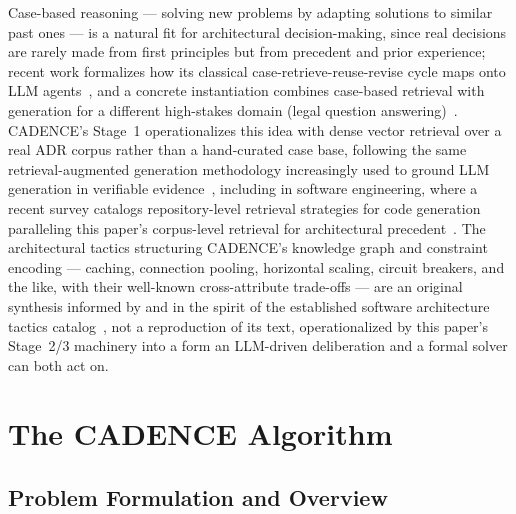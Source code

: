 \documentclass[preprint,12pt,authoryear]{elsarticle}
\renewcommand{\_}{\textunderscore\allowbreak{}}
\begin{document}
Case-based reasoning --- solving new problems by adapting solutions to similar past ones --- is a natural fit for architectural decision-making, since real decisions are rarely made from first principles but from precedent and prior experience; recent work formalizes how its classical case-retrieve-reuse-revise cycle maps onto LLM agents~\citep{hatalis2025cbrllm}, and a concrete instantiation combines case-based retrieval with generation for a different high-stakes domain (legal question answering)~\citep{wiratunga2024cbrrag}. CADENCE's Stage~1 operationalizes this idea with dense vector retrieval over a real ADR corpus rather than a hand-curated case base, following the same retrieval-augmented generation methodology increasingly used to ground LLM generation in verifiable evidence~\citep{lewis2020rag}, including in software engineering, where a recent survey catalogs repository-level retrieval strategies for code generation paralleling this paper's corpus-level retrieval for architectural precedent~\citep{tao2025ragcode}. The architectural tactics structuring CADENCE's knowledge graph and constraint encoding --- caching, connection pooling, horizontal scaling, circuit breakers, and the like, with their well-known cross-attribute trade-offs --- are an original synthesis informed by and in the spirit of the established software architecture tactics catalog~\citep{bass2021saip}, not a reproduction of its text, operationalized by this paper's Stage~2/3 machinery into a form an LLM-driven deliberation and a formal solver can both act on.

\section{The CADENCE Algorithm}
\label{sec:method}

\subsection{Problem Formulation and Overview}
\end{document}
